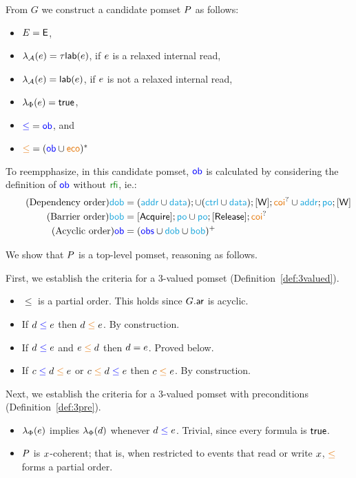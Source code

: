 From $G$ we construct a candidate pomset $P$ as follows:
\begin{itemize}
\item $E= \textsf{E}$,
\item $\lambda_{\mathcal{A}}(e)=\tau \mathsf{lab}(e)$, if $e$ is a relaxed
  internal read, 
\item $\lambda_{\mathcal{A}}(e)=\mathsf{lab}(e)$, if $e$ is not a relaxed
  internal read,
\item $\lambda_{\Phi}(e)=\mathsf{true}$,
\item ${\mathrel{{\color{blue}\leq}}} = {\mathrel{\color{blue}\mathsf{ob}}}$, and
\item ${\gtN} = ({\rob} \cup {\reco})^*$
\end{itemize}
To reempphasize, in this candidate pomset, $\mathrel{\color{blue}\mathsf{ob}}$ is calculated by considering the definition of $\mathrel{\color{blue}\mathsf{ob}}$ without $\rrfi$, ie.:
\begin{align*}
  \tag{Dependency order}
  {\rdob} &\eqdef\smash{
    ({\raddr}\cup{\rdata});
    \cup ({\rctrl}\cup{\rdata}); {\IDW}; {\rcoi}^?
    \cup {\raddr}; {\rpox}; {\IDW}
  }
  \\
  \tag{Barrier order}
  {\rbob} &\eqdef\smash{
    {\IDAcq}; {\rpox}
    \cup {\rpox};{\IDRel}; {\rcoi}^?
  }
  \\
  \tag{Acyclic order}
  {\rob} &\eqdef\smash{
    ({\robs} \cup {\rdob} \cup {\rbob})^+
  }
\end{align*}


We show that $P$ is a top-level pomset, reasoning as follows.

 First, we establish the criteria for a 3-valued pomset (Definition~\ref{def:3valued}).
\begin{itemize}
\item ${\le}$ is a partial order.  This holds since $G.{\mathrel{\mathsf{ar}}}$ is acyclic.
\item If $d \mathrel{{\color{blue}\leq}} e$ then $\bEv \gtN \aEv$.  By construction.
\item If $d \mathrel{{\color{blue}\leq}} e$ and $\aEv \gtN \bEv$ then $d = e$.  Proved below.
\item If $\cEv \le \bEv \gtN \aEv$ or $\cEv \gtN \bEv \le \aEv$ then
  $\cEv \gtN \aEv$. By construction.
\end{itemize}

Next, we establish the criteria for a 3-valued pomset with preconditions (Definition~\ref{def:3pre}).
\begin{itemize}
\item $\lambda_{\Phi}(e)$ implies $\lambda_{\Phi}(d)$ whenever
  $d\mathrel{{\color{blue}\leq}}e$.   Trivial, since every formula is $\mathsf{true}$.
\item $P$ is $x$-coherent; that is, when restricted to events that
  read or write $x$, $\gtN$ forms a partial order.
\end{itemize}

